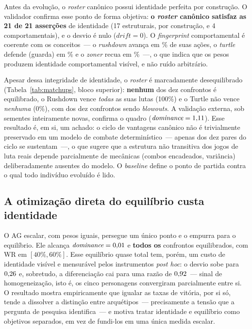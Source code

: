 \documentclass[12pt]{article}
\begin{document}
Antes da evolução, o \emph{roster} canônico possui identidade perfeita por
construção. O validador confirma esse ponto de forma objetiva:
\textbf{o \emph{roster} canônico satisfaz as 21 de 21 asserções} de identidade (17
estruturais, por construção, e 4 comportamentais), e o desvio é nulo
($\textit{drift}=0$). O \emph{fingerprint} comportamental é coerente
com os conceitos~--- o \emph{rushdown} avança em \fpRushAdv{}\% de suas ações, o
\emph{turtle} defende (guarda) em \fpTurtleDef{}\% e o \emph{zoner} recua em \fpZonerRet{}\%~---,
o que indica que os pesos produzem identidade comportamental visível, e não ruído
arbitrário.

Apesar dessa integridade de identidade, o \emph{roster} é marcadamente desequilibrado
(Tabela~\ref{tab:matchups}, bloco superior): \textbf{nenhum} dos dez confrontos é
equilibrado, o Rushdown vence \emph{todas} as suas lutas (100\%) e o Turtle não vence
\emph{nenhuma} (0\%), com \blowCan{} dos dez confrontos sendo \emph{blowouts}. A validação
externa, sob \extNSeeds{} sementes inteiramente novas, confirma o quadro
($\textit{dominance}=1{,}11{}$). Esse resultado é, em si, um achado: o ciclo de vantagens
canônico não é trivialmente preservado em um modelo de combate determinístico~--- apenas
\cycleCan{} dos dez pares do ciclo se sustentam~---, o que sugere que a
estrutura não transitiva dos jogos de luta reais depende parcialmente de mecânicas
(combos encadeados, variância) deliberadamente ausentes do modelo. O
\emph{baseline} define o ponto de partida contra o qual todo indivíduo evoluído é
lido.

\subsection{A otimização direta do equilíbrio custa identidade}

O AG escalar, com pesos iguais, persegue um único ponto e o empurra para o
equilíbrio. Ele alcança $\textit{dominance}=0{,}01{}$ e \textbf{todos os \eqAg{}}
confrontos equilibrados, com WR em $[40\%,60\%]$. Esse equilíbrio quase total tem,
porém, um custo de identidade visível e mensurável pelos instrumentos
\emph{post hoc}: o desvio sobe para $0{,}26{}$ e, sobretudo, a diferenciação cai
para uma razão de $0{,}92{}$~--- sinal de homogeneização, isto é, os cinco
personagens convergiram parcialmente entre si. O resultado mostra empiricamente
que igualar as taxas de vitória, por si só, tende a dissolver a distinção entre
arquétipos~--- precisamente a tensão que a pergunta de pesquisa identifica~--- e
motiva tratar identidade e equilíbrio como objetivos separados, em vez de fundi-los
em uma única medida escalar.
\end{document}
